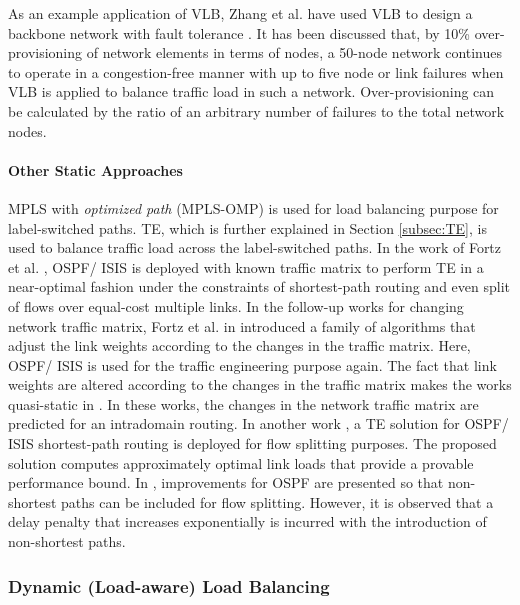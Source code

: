 \documentclass[10pt]{IEEEtran}
\begin{document}
As an example application of VLB, Zhang et al. have used VLB to design a backbone network with fault tolerance \cite{zhang2008designing}. It has been discussed that, by 10\% over-provisioning of network elements in terms of nodes, a 50-node network continues to operate in a congestion-free manner with up to five node or link failures when VLB is applied to balance traffic load in such a network. Over-provisioning can be calculated by the ratio of an arbitrary number of failures to the total network nodes. 



\vspace{2mm}
\paragraph{Other Static Approaches}

MPLS with \textit{optimized path} (MPLS-OMP) \cite{villamizar1999mpls} is used for load balancing purpose for label-switched paths. TE, which is further explained in Section \ref{subsec:TE}, is used to balance traffic load across the label-switched paths. In the work of Fortz et al. \cite{fortz2000internet}, OSPF/ ISIS is deployed with known traffic matrix to perform TE in a near-optimal fashion under the constraints of shortest-path routing and even split of flows over equal-cost multiple links. In the follow-up works for changing network traffic matrix, Fortz et al. in \cite{fortz2002optimizing, fortz2002traffic} introduced a family of algorithms that adjust the link weights according to the changes in the traffic matrix. Here, OSPF/ ISIS is used for the traffic engineering purpose again. The fact that link weights are altered according to the changes in the traffic matrix makes the works quasi-static in \cite{fortz2002optimizing, fortz2002traffic}. In these works, the changes in the network traffic matrix are predicted for an intradomain routing. In another work \cite{sridharan2005achieving}, a TE solution for OSPF/ ISIS shortest-path routing is deployed for flow splitting purposes. The proposed solution computes approximately optimal link loads that provide a provable performance bound. In \cite{fong2005better, xu2007deft, xu2011link}, improvements for OSPF are presented so that non-shortest paths can be included for flow splitting. However, it is observed that a delay penalty that increases exponentially is incurred with the introduction of non-shortest paths.

\vspace{2mm}
\subsubsection{Dynamic (Load-aware) Load Balancing}
\label{subsubsec: dynamic_approach}
\end{document}
